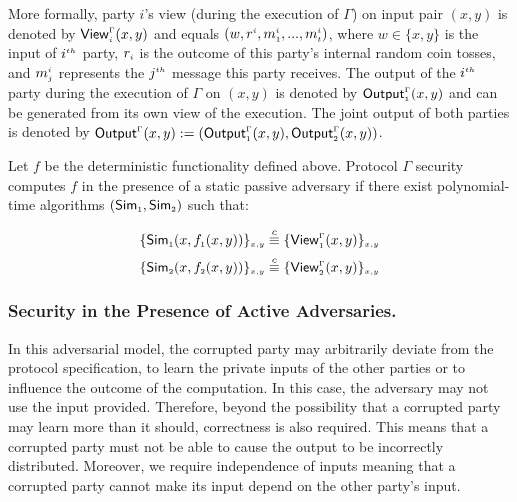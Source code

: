  More formally, party $i$’s view (during the execution of $\Gamma$) on input pair  $(x, y)$ is denoted by $\mathsf{View}_{\scriptscriptstyle i}^{\scriptscriptstyle \Gamma}(x,y)$ and equals $(w, r^{\scriptscriptstyle i}, m_{\scriptscriptstyle 1}^{\scriptscriptstyle i}, ..., m_{\scriptscriptstyle t}^{\scriptscriptstyle i})$, where $w\in\{x,y\}$ is the input of $i^{\scriptscriptstyle th}$ party, $r_{\scriptscriptstyle i}$ is the outcome of this party's internal random coin tosses, and $m_{\scriptscriptstyle j}^{\scriptscriptstyle i}$ represents the $j^{\scriptscriptstyle th}$ message this party receives.  The output of the $i^{\scriptscriptstyle th}$ party during the execution of $\Gamma$ on $(x, y)$ is denoted by $\mathsf{Output}_{\scriptscriptstyle 1}^{\scriptscriptstyle \Gamma}(x,y)$ and can be generated from its own view of the execution.  The joint output of both parties is denoted by $\mathsf{Output}^{\scriptscriptstyle \Gamma}(x,y):=(\mathsf{Output}_{\scriptscriptstyle 1}^{\scriptscriptstyle \Gamma}(x,y), \mathsf{Output}_{\scriptscriptstyle 2}^{\scriptscriptstyle \Gamma}(x,y))$.

\begin{definition}
Let $f$ be the deterministic functionality defined above. Protocol $\Gamma$ security computes $f$ in the presence of a static  passive adversary if there exist polynomial-time algorithms $(\mathsf {Sim}_{\scriptscriptstyle 1}, \mathsf {Sim}_{\scriptscriptstyle 2})$ such that:
\end{definition}
%
  \begin{equation*}
  \{\mathsf {Sim}_{\scriptscriptstyle 1}(x,f_{\scriptscriptstyle 1}(x,y))\}_{\scriptscriptstyle x,y}\stackrel{c}{\equiv} \{\mathsf{View}_{\scriptscriptstyle 1}^{\scriptscriptstyle \Gamma}(x,y) \}_{\scriptscriptstyle x,y}\\
  \end{equation*}
  \begin{equation*}
    \{\mathsf{Sim}_{\scriptscriptstyle 2}(x,f_{\scriptscriptstyle 2}(x,y))\}_{\scriptscriptstyle x,y}\stackrel{c}{\equiv} \{\mathsf{View}_{\scriptscriptstyle 2}^{\scriptscriptstyle \Gamma}(x,y) \}_{\scriptscriptstyle x,y}
  \end{equation*}
  

\vs

 \subsubsection{Security in the Presence of Active Adversaries.}  In this adversarial model, the corrupted party may
arbitrarily deviate from the protocol specification, to learn the private inputs of the other parties or to influence the outcome of the computation. In this case,  the adversary may not use the input provided. Therefore, beyond the possibility that a corrupted party may learn more than it should, correctness is also required. This means that a corrupted party must not be able to cause the output to be incorrectly distributed. Moreover, we require independence of inputs meaning that a corrupted party cannot make its input depend on the other party’s input. 

